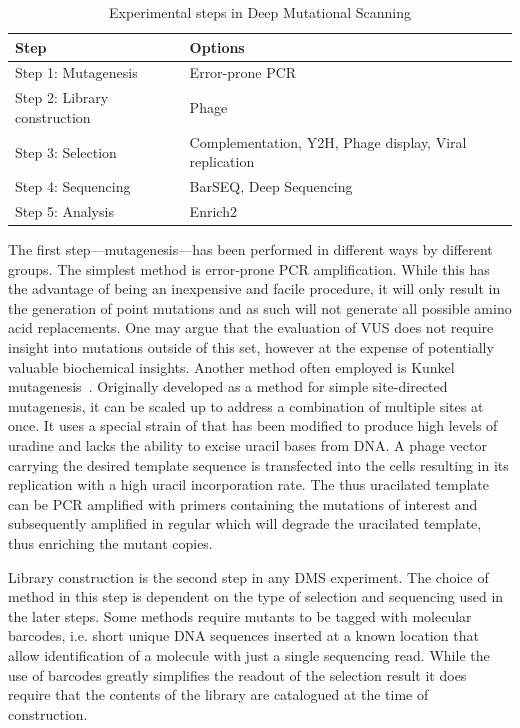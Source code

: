 \begin{table}[h!]
	\centering
	\caption{Experimental steps in Deep Mutational Scanning}
	\label{table:DMSphases}
	\begin{tabular}{l p{10cm}}
	\textbf{Step}                & \textbf{Options} \\ \hline \hline
	Step 1: Mutagenesis          & Error-prone PCR\\ %
	Step 2: Library construction & Phage\\ %
	Step 3: Selection            & Complementation, Y2H, Phage display, Viral replication\\ %
	Step 4: Sequencing           & BarSEQ, Deep Sequencing\\ %
	Step 5: Analysis             & Enrich2\\ %
	\end{tabular}
\end{table}

The first step---mutagenesis---has been performed in different ways by different groups. The simplest method is error-prone PCR amplification\cite{oxPCRetc}. While this has the advantage of being an inexpensive and facile procedure, it will only result in the generation of point mutations and as such will not generate all possible amino acid replacements. One may argue that the evaluation of VUS does not require insight into mutations outside of this set, however at the expense of potentially valuable biochemical insights. Another method often employed is Kunkel mutagenesis~\cite{Kunkel}. Originally developed as a method for simple site-directed mutagenesis, it can be scaled up to address a combination of multiple sites at once. It uses a special strain of  that has been modified to produce high levels of uradine and lacks the ability to excise uracil bases from DNA. A phage vector carrying the desired template sequence is transfected into the cells resulting in its replication with a high uracil incorporation rate. The thus uracilated template can be PCR amplified with primers containing the mutations of interest and subsequently amplified in regular  which will degrade the uracilated template, thus enriching the mutant copies. %

Library construction is the second step in any DMS experiment. The choice of method in this step is dependent on the type of selection and sequencing used in the later steps. Some methods require mutants to be tagged with molecular barcodes, i.e. short unique DNA sequences inserted at a known location that allow identification of a molecule with just a single sequencing read. While the use of barcodes greatly simplifies the readout of the selection result it does require that the contents of the library are catalogued at the time of construction.

